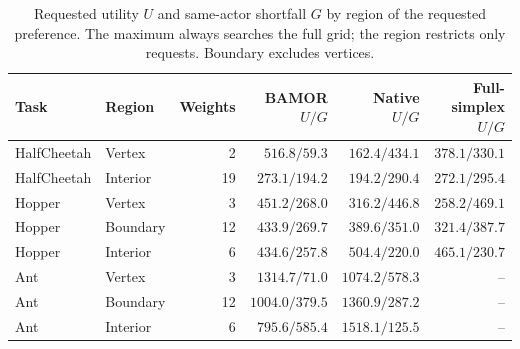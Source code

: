 \begin{table}[!htbp]
\centering\small\setlength{\tabcolsep}{4.5pt}
\caption{Requested utility $U$ and same-actor shortfall $G$ by region of the requested preference. The maximum always searches the full grid; the region restricts only requests. Boundary excludes vertices.}
\label{tab:grid_geometry}
\begin{tabular}{@{}llrrrr@{}}
\toprule
Task & Region & Weights & BAMOR $U/G$ & Native $U/G$ & Full-simplex $U/G$ \\
\midrule
HalfCheetah & Vertex & 2 & $516.8/59.3$ & $162.4/434.1$ & $378.1/330.1$ \\
HalfCheetah & Interior & 19 & $273.1/194.2$ & $194.2/290.4$ & $272.1/295.4$ \\
Hopper & Vertex & 3 & $451.2/268.0$ & $316.2/446.8$ & $258.2/469.1$ \\
Hopper & Boundary & 12 & $433.9/269.7$ & $389.6/351.0$ & $321.4/387.7$ \\
Hopper & Interior & 6 & $434.6/257.8$ & $504.4/220.0$ & $465.1/230.7$ \\
Ant & Vertex & 3 & $1314.7/71.0$ & $1074.2/578.3$ & -- \\
Ant & Boundary & 12 & $1004.0/379.5$ & $1360.9/287.2$ & -- \\
Ant & Interior & 6 & $795.6/585.4$ & $1518.1/125.5$ & -- \\
\bottomrule
\end{tabular}
\end{table}
